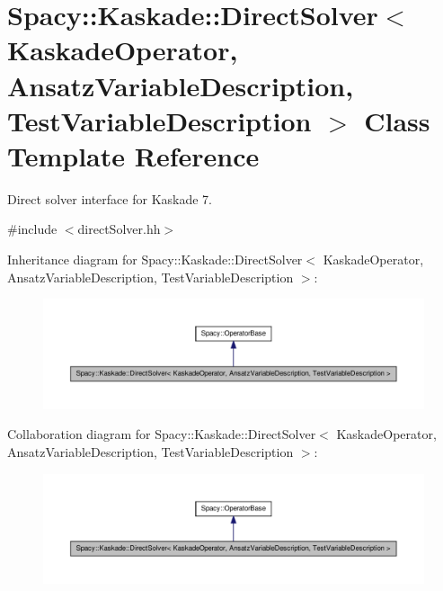 \hypertarget{classSpacy_1_1Kaskade_1_1DirectSolver}{\section{\-Spacy\-:\-:\-Kaskade\-:\-:\-Direct\-Solver$<$ \-Kaskade\-Operator, \-Ansatz\-Variable\-Description, \-Test\-Variable\-Description $>$ \-Class \-Template \-Reference}
\label{classSpacy_1_1Kaskade_1_1DirectSolver}
}


\-Direct solver interface for \-Kaskade 7.  




{\ttfamily \#include $<$direct\-Solver.\-hh$>$}



\-Inheritance diagram for \-Spacy\-:\-:\-Kaskade\-:\-:\-Direct\-Solver$<$ \-Kaskade\-Operator, \-Ansatz\-Variable\-Description, \-Test\-Variable\-Description $>$\-:
\nopagebreak
\begin{figure}[H]
\begin{center}
\leavevmode
\includegraphics[width=350pt]{classSpacy_1_1Kaskade_1_1DirectSolver__inherit__graph}
\end{center}
\end{figure}


\-Collaboration diagram for \-Spacy\-:\-:\-Kaskade\-:\-:\-Direct\-Solver$<$ \-Kaskade\-Operator, \-Ansatz\-Variable\-Description, \-Test\-Variable\-Description $>$\-:
\nopagebreak
\begin{figure}[H]
\begin{center}
\leavevmode
\includegraphics[width=350pt]{classSpacy_1_1Kaskade_1_1DirectSolver__coll__graph}
\end{center}
\end{figure}
